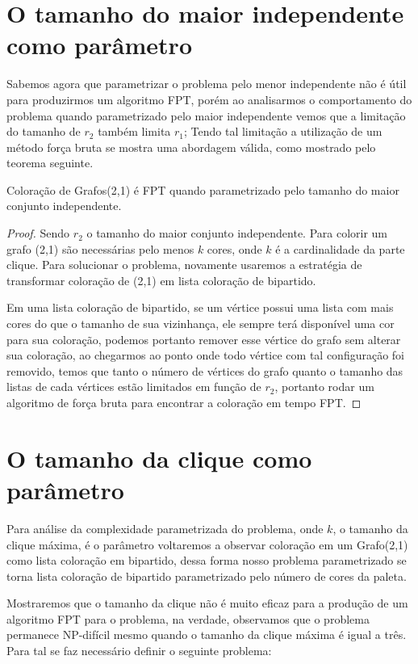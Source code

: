 \section{O tamanho do maior independente como parâmetro}

Sabemos agora que parametrizar o problema pelo menor independente não é útil para produzirmos um algoritmo FPT, porém ao analisarmos o comportamento do problema quando parametrizado pelo maior independente vemos que a limitação do tamanho de $r_2$ também limita $r_1$; Tendo tal limitação a utilização de um método força bruta se mostra uma abordagem válida, como mostrado pelo teorema seguinte.

\begin{teorema}
Coloração de Grafos(2,1) é FPT quando parametrizado pelo tamanho do maior conjunto independente.
\end{teorema}

\begin{proof}
Sendo $r_2$ o tamanho do maior conjunto independente. Para colorir um grafo (2,1) são necessárias pelo menos $k$ cores, onde $k$ é a cardinalidade da parte clique. Para solucionar o problema, novamente usaremos a estratégia de transformar coloração de (2,1) em lista coloração de bipartido.
  
Em uma lista coloração de bipartido, se um vértice possui uma lista com mais cores do que o tamanho de sua vizinhança, ele sempre terá disponível uma cor para sua coloração, podemos portanto remover esse vértice do grafo sem alterar sua coloração, ao chegarmos ao ponto onde todo vértice com tal configuração foi removido, temos que tanto o número de vértices do grafo quanto o tamanho das listas de cada vértices estão limitados em função de $r_2$, portanto rodar um algoritmo de força bruta para encontrar a coloração em tempo FPT.     
\end{proof}

\section{O tamanho da clique como parâmetro}

Para análise da complexidade parametrizada do problema, onde $k$, o tamanho da clique máxima, é o parâmetro voltaremos a observar coloração em um Grafo(2,1) como lista coloração em bipartido, dessa forma nosso problema parametrizado se torna lista coloração de bipartido parametrizado pelo número de cores da paleta. 

Mostraremos que o tamanho da clique não é muito eficaz para a produção de um algoritmo FPT para o problema, na verdade, observamos que o problema permanece NP-difícil mesmo quando o tamanho da clique máxima é igual a três. Para tal se faz necessário definir o seguinte problema: 

